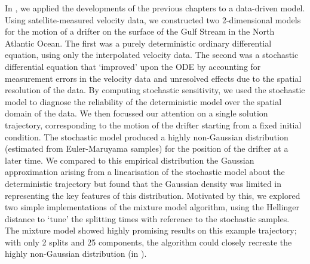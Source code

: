In , we applied the developments of the previous chapters to a data-driven model.
Using satellite-measured velocity data, we constructed two 2-dimensional models for the motion of a drifter on the surface of the Gulf Stream in the North Atlantic Ocean.
The first was a purely deterministic ordinary differential equation, using only the interpolated velocity data.
The second was a stochastic differential equation that `improved' upon the ODE by accounting for measurement errors in the velocity data and unresolved effects due to the spatial resolution of the data.
By computing stochastic sensitivity, we used the stochastic model to diagnose the reliability of the deterministic model over the spatial domain of the data.
We then focussed our attention on a single solution trajectory, corresponding to the motion of the drifter starting from a fixed initial condition.
The stochastic model produced a highly non-Gaussian distribution (estimated from Euler-Maruyama samples) for the position of the drifter at a later time.
We compared to this empirical distribution the Gaussian approximation arising from a linearisation of the stochastic model about the deterministic trajectory but found that the Gaussian density was limited in representing the key features of this distribution.
Motivated by this, we explored two simple implementations of the mixture model algorithm, using the Hellinger distance to `tune' the splitting times with reference to the stochastic samples.
The mixture model showed highly promising results on this example trajectory; with only 2 splits and 25 components, the algorithm could closely recreate the highly non-Gaussian distribution (in ).



